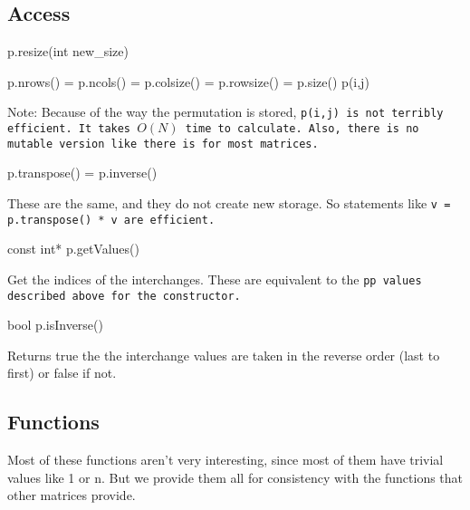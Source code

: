 \subsection{Access}
\label{Permutation_Access}

\begin{tmvcode}
p.resize(int new_size)
\end{tmvcode}

\begin{tmvcode}
p.nrows() = p.ncols() = p.colsize() = p.rowsize() = p.size()
p(i,j)
\end{tmvcode}
Note: Because of the way the permutation is stored, \tt{p(i,j)} is not
terribly efficient.  It takes $O(N)$ time to calculate.  Also, there is no
mutable version like there is for most matrices.

\begin{tmvcode}
p.transpose() = p.inverse()
\end{tmvcode}
These are the same, and they do not create new storage.  So statements like
\tt{v = p.transpose() * v} are efficient.

\begin{tmvcode}
const int* p.getValues()
\end{tmvcode}
Get the indices of the interchanges.  These are equivalent to the \tt{pp} values
described above for the constructor.

\begin{tmvcode}
bool p.isInverse()
\end{tmvcode}
Returns true the the interchange values are taken in the reverse order (last to first)
or false if not.
\vspace{12pt}

\subsection{Functions}
\label{Permutation_Functions}

Most of these functions aren't very interesting, since most of them have 
trivial values like 1 or n.  But we provide them all for consistency with the 
functions that other matrices provide.

